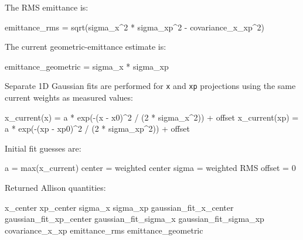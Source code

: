 \documentclass[
]{article}
\newenvironment{Shaded}{}{}
\newcommand{\NormalTok}[1]{#1}
\begin{document}
The RMS emittance is:

\begin{Shaded}
\begin{Highlighting}[]
\NormalTok{emittance\_rms = sqrt(sigma\_x\^{}2 * sigma\_xp\^{}2 {-} covariance\_x\_xp\^{}2)}
\end{Highlighting}
\end{Shaded}

The current geometric-emittance estimate is:

\begin{Shaded}
\begin{Highlighting}[]
\NormalTok{emittance\_geometric = sigma\_x * sigma\_xp}
\end{Highlighting}
\end{Shaded}

Separate 1D Gaussian fits are performed for \texttt{x} and \texttt{xp}
projections using the same current weights as measured values:

\begin{Shaded}
\begin{Highlighting}[]
\NormalTok{x\_current(x)  = a * exp({-}(x  {-} x0)\^{}2  / (2 * sigma\_x\^{}2))  + offset}
\NormalTok{x\_current(xp) = a * exp({-}(xp {-} xp0)\^{}2 / (2 * sigma\_xp\^{}2)) + offset}
\end{Highlighting}
\end{Shaded}

Initial fit guesses are:

\begin{Shaded}
\begin{Highlighting}[]
\NormalTok{a      = max(x\_current)}
\NormalTok{center = weighted center}
\NormalTok{sigma  = weighted RMS}
\NormalTok{offset = 0}
\end{Highlighting}
\end{Shaded}

Returned Allison quantities:

\begin{Shaded}
\begin{Highlighting}[]
\NormalTok{x\_center}
\NormalTok{xp\_center}
\NormalTok{sigma\_x}
\NormalTok{sigma\_xp}
\NormalTok{gaussian\_fit\_x\_center}
\NormalTok{gaussian\_fit\_xp\_center}
\NormalTok{gaussian\_fit\_sigma\_x}
\NormalTok{gaussian\_fit\_sigma\_xp}
\NormalTok{covariance\_x\_xp}
\NormalTok{emittance\_rms}
\NormalTok{emittance\_geometric}
\end{Highlighting}
\end{Shaded}
\end{document}
